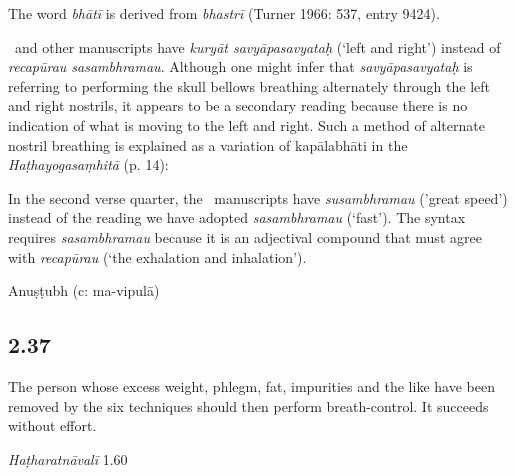 \begin{ekdosis}
\begin{testimonia}[hp02_036]
\end{testimonia}

\begin{philcomm}[hp02_036]
The word \emph{bhātī} is derived from \emph{bhastrī} (Turner 1966: 537, entry 9424).

\etaTwo\ and other manuscripts have \emph{kuryāt savyāpasavyataḥ} (‘left and right’) instead of \emph{recapūrau sasambhramau}. Although one might infer that \emph{savyāpasavyataḥ} is referring to performing the skull bellows breathing alternately through the left and right nostrils, it appears to be a secondary reading because there is no indication of what is moving to the left and right. Such a method of alternate nostril breathing is explained as a variation of kapālabhāti in the \emph{Haṭhayogasaṃhitā} (p. 14):
\begin{versinnote}
\end{versinnote}

In the second verse quarter, the \textalpha\ manuscripts have \emph{susambhramau} ('great speed') instead of the reading we have adopted \emph{sasambhramau} (`fast'). The syntax requires \emph{sasambhramau} because it is an adjectival compound that must agree with \emph{recapūrau} (`the exhalation and inhalation').  
\end{philcomm}

\begin{metre}[hp02_036]
Anuṣṭubh (c: ma-vipulā)
\end{metre}

\subsection*{2.37}
\begin{translation}[hp02_037]
The person whose excess weight, phlegm, fat, impurities and the like have been removed by the six techniques should then perform breath-control. It succeeds without effort.
\end{translation}


\begin{testimonia}[hp02_037]
\emph{Haṭharatnāvalī} 1.60


\end{testimonia}
\end{ekdosis}
